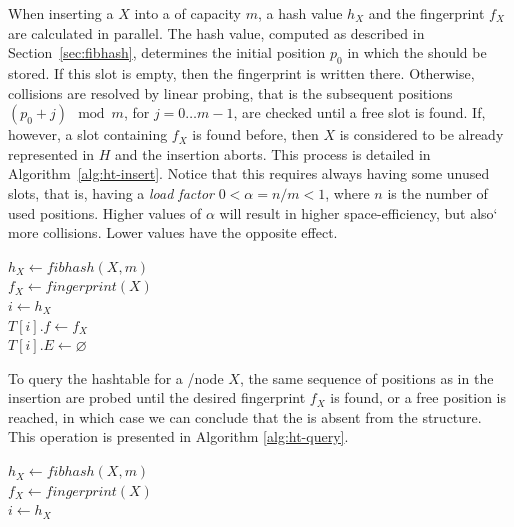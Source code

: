 When inserting a \kmer $X$ into a \dBHT of capacity $m$, a hash value $h_X$ and the fingerprint $f_X$ are calculated in parallel. The hash value, computed as described in Section~\ref{sec:fibhash}, determines the initial position $p_0$ in which the \kmer should be stored. If this slot is empty, then the fingerprint is written there. Otherwise, collisions are resolved by linear probing, that is the subsequent positions $(p_0+j)\mod m$, for $j=0\ldots m-1$, are checked until a free slot is found. If, however, a slot containing $f_X$ is found before, then $X$ is considered to be already represented in $H$ and the insertion aborts. This process is detailed in Algorithm~\ref{alg:ht-insert}. 
Notice that this requires always having some unused slots, that is, having a \emph{load factor} $0 < \alpha=n/m < 1$, where $n$ is the number of used positions. Higher values of $\alpha$ will result in higher space-efficiency, but also` more collisions. Lower values have the opposite effect. 


\begin{algorithm}
	\caption{$T.\mathit{insert}(X$)}\label{alg:ht-insert}
	$h_X \gets \mathit{fibhash}(X, m)$\\
	$f_X \gets \mathit{fingerprint}(X)$\\
	$i \gets h_X$\\
	$T[i].f\gets f_X$\\
	$T[i].E\gets \varnothing$\\
\end{algorithm}

To query the hashtable for a \kmer/node $X$, the same sequence of positions as in the insertion are probed until the desired fingerprint $f_X$ is found, or a free position is reached, in which case we can conclude that the \kmer is absent from the structure. This operation is presented in Algorithm \ref{alg:ht-query}.

\begin{algorithm}
	\caption{$T.\mathit{query}(X)$}\label{alg:ht-query}
	$h_X \gets \mathit{fibhash}(X, m)$\\
  $f_X \gets \mathit{fingerprint}(X)$\\
	$i \gets h_X$\\
  \Return{$\varnothing$}
\end{algorithm}


